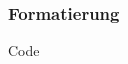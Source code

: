 \begin{frame}
    \frametitle{Formatierung}
    \begin{block}{Code}
        \begin{columns}
            \begin{column}{0.59\textwidth}
                
            \end{column}
            \begin{column}{0.35\textwidth}
                \rule{0pt}{15pt}
                \\
                
            \end{column}
        \end{columns}
    \end{block}
\end{frame}
